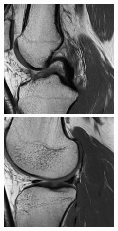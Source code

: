 \begin{figure}[H]
  \includegraphics[width=\linewidth]{imgs/transfer_pers_x2.png}
\endminipage\hfill
{}%
  \includegraphics[width=\linewidth]{imgs/transfer_pers_x3.png}

\end{figure}

